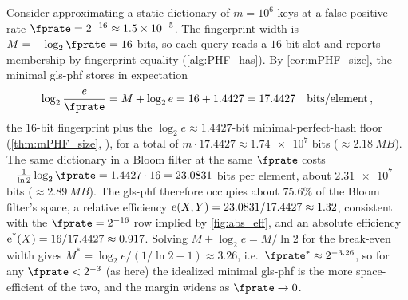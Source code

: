\documentclass[ ../main.tex]{subfiles}
\begin{document}
\begin{example}
\label{ex:dictionary}
Consider approximating a static dictionary of $m = 10^6$ keys at a false
positive rate $\fprate = 2^{-16} \approx \num{1.5e-5}$. The fingerprint width is
$M = -\log_2 \fprate = 16$ bits, so each query reads a $16$-bit slot and reports
membership by fingerprint equality (\cref{alg:PHF_has}). By
\cref{cor:mPHF_size}, the minimal \gls{gls-phf} stores in expectation
\begin{equation}
    \log_2 \frac{e}{\fprate} = M + \log_2 e = 16 + \num{1.4427} = \num{17.4427}
    \quad \si{bits \per element}\,,
\end{equation}
the $16$-bit fingerprint plus the $\log_2 e \approx \num{1.4427}$-bit
minimal-perfect-hash floor (\cref{thm:mPHF_size}, \cite{mehlhorn1982}), for a
total of $m \cdot \num{17.4427} \approx \num{1.74e7}$ bits ($\approx \SI{2.18}{MB}$).
The same dictionary in a Bloom filter at the same $\fprate$ costs
$-\tfrac{1}{\ln 2}\log_2 \fprate = \num{1.4427}\cdot 16 = \num{23.0831}$ bits per
element, about $\num{2.31e7}$ bits ($\approx \SI{2.89}{MB}$). The \gls{gls-phf}
therefore occupies about $\num{75.6}\%$ of the Bloom filter's space, a relative
efficiency $\operatorname{e}(X,Y) = \num{23.0831}/\num{17.4427} \approx \num{1.32}$,
consistent with the $\fprate = 2^{-16}$ row implied by \cref{fig:abs_eff}, and an
absolute efficiency $\operatorname{e^*}(X) = 16/\num{17.4427} \approx \num{0.917}$. Solving
$M + \log_2 e = M/\ln 2$ for the break-even width gives $M^* = \log_2 e/(1/\ln 2 -
1) \approx \num{3.26}$, i.e.\ $\fprate^* \approx 2^{-3.26}$, so for any
$\fprate < 2^{-3}$ (as here) the idealized minimal \gls{gls-phf} is the more
space-efficient of the two, and the margin widens as $\fprate \to 0$.
\end{example}
\end{document}
